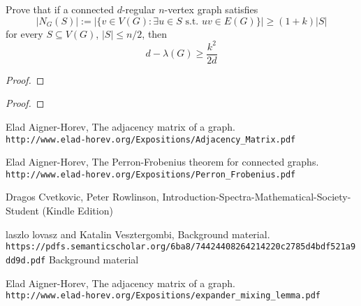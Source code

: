 \documentclass[a4paper, 11pt, oneside]{article}
\newenvironment{problem}[1]
  {\renewcommand\theinnercustomprob{#1}\innercustomprob}
  {\endinnercustomprob}
\newcommand\abs[1]{\left|#1\right|}
\begin{document}
 \begin{problem}{8}\label{problem8}
 Prove that if a connected $d$-regular $n$-vertex graph satisfies
 \begin{equation*}
\abs{N_G(S)} := \abs{\{ v \in V(G) : \exists u \in S \text{ s.t. } uv\in E(G)\}} \geq (1 + k)\abs{S}
\end{equation*}
for every $S \subseteq V(G)$, $\abs{S} \leq n/2$, then
 \begin{equation*}
d - \lambda(G) \geq \frac{k^2}{2d}
\end{equation*}
\end{problem}
\begin{proof}

\end{proof}		

 \begin{problem}{9}\label{problem9}
\end{problem}
\begin{proof}

\end{proof}		

\begin{thebibliography}{9} 
Elad Aigner-Horev,
The adjacency matrix of a graph.
\\\texttt{http://www.elad-horev.org/Expositions/Adjacency\_Matrix.pdf}

Elad Aigner-Horev,
The Perron-Frobenius theorem for connected graphs.
\\\texttt{http://www.elad-horev.org/Expositions/Perron\_Frobenius.pdf}

Dragos Cvetkovic, Peter Rowlinson,
Introduction-Spectra-Mathematical-Society-Student (Kindle Edition)

laszlo lovasz and Katalin Vesztergombi,
Background material.
\\\texttt{https://pdfs.semanticscholar.org/6ba8/74424408264214220c2785d4bdf521a9dd9d.pdf}
Background material

Elad Aigner-Horev,
The adjacency matrix of a graph.
\\\texttt{http://www.elad-horev.org/Expositions/expander\_mixing\_lemma.pdf}
\end{thebibliography}
\end{document}
